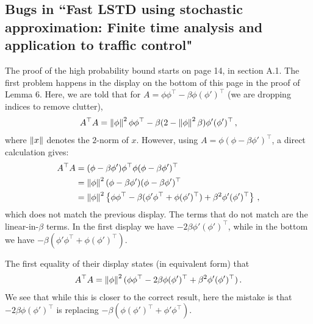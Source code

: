 \documentclass{article}
\begin{document}
\subsection{Bugs in ``Fast LSTD using stochastic approximation: Finite time analysis and application to traffic control"}
The proof of the high probability bound starts on page 14, in section A.1.
The first problem happens in the display on the bottom of this page in the proof of Lemma 6.
Here, we are told that for $A = \phi \phi^\top - \beta \phi (\phi')^\top$ (we are dropping indices to remove clutter),
\begin{align*}
A^\top A = \left\| \phi\right\|^2 \phi \phi^\top - \beta ( 2 - \left\| \phi\right\|^2\beta ) \phi' (\phi')^\top\,,
\end{align*}
where $\left\| x\right\|$ denotes the $2$-norm of $x$.
However, using $A = \phi( \phi-\beta \phi')^\top$, a direct calculation gives:
\begin{align*}
A^\top A 
& = ( \phi-\beta \phi') \phi^\top \phi ( \phi-\beta \phi')^\top \\
& = \left\| \phi\right\|^2  ( \phi-\beta \phi') ( \phi-\beta \phi')^\top \\
& = \left\| \phi\right\|^2  \left\{ \phi \phi^\top-\beta (\phi' \phi^\top + \phi (\phi')^\top) + \beta^2 \phi' (\phi')^\top \right\}\,,
\end{align*}
which does not match the previous display.
The terms that do not match are the linear-in-$\beta$ terms.
In the first display we have $ -2 \beta \phi' (\phi')^\top$, while in the bottom we have $-\beta (\phi' \phi^\top + \phi (\phi')^\top)$.

The first equality of their display states (in equivalent form) that 
\begin{align*}
A^\top A = \left\| \phi\right\|^2 ( \phi \phi^\top - 2\beta \phi (\phi')^\top +\beta^2 \phi' (\phi')^\top )\,.
\end{align*}
We see that while this is closer to the correct result, here the mistake is that $-2\beta \phi  (\phi')^\top$ is replacing $-\beta(\phi (\phi')^\top + \phi' \phi^\top)$.
\begin{comment}
We also have a hard time following the rest of the proof of this lemma.
In fact, we have a simple proof for a result similar to stated in this lemma.
This works by observing that one needs to 
bound the Lipschitz factor of $\theta \mapsto \bar T_n \dots \bar T_{t+1} ( (I-\gamma_t A_t)\theta + b_t )$, where
$A_t = \phi_t (\phi_t -\beta \phi_t')^\top$, $b_t = r_{i_t} \phi_t$ and
 $\bar T_t(\theta) = (I-\gamma_t \bar A_T) \theta + \bar b_T$ (we assume that the stepsize sequence is deterministic).
 Clearly, this Lipschitz factor can be bounded by $\prod_{s=t+1}^n \norm{I-\gamma_s \bar A_T}_2 \norm{I-\gamma_t A_t}_2$
 (the composition of Lipschitz maps is Lipschitz with a factor that is the product of the individual maps' Lipschitz factors). 
Invoking (A3) then indeed gives some version of Lemma 7.
By making an appropriate assumption (similar to those used in our paper), 
$\prod_{s=t+1}^n \norm{I-\gamma_s \bar A_T}_2 $ can be controlled.
\end{comment}
\end{document}
